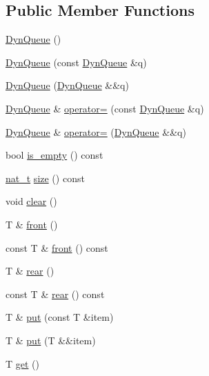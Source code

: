 \subsection*{Public Member Functions}
\begin{DoxyCompactItemize}
\item 
\hyperlink{class_designar_1_1_dyn_queue_a947ebdf2503509cdacd5e34a6de29197}{Dyn\+Queue} ()
\item 
\hyperlink{class_designar_1_1_dyn_queue_a612ed3480c13f60be2f9706601f846b1}{Dyn\+Queue} (const \hyperlink{class_designar_1_1_dyn_queue}{Dyn\+Queue} \&q)
\item 
\hyperlink{class_designar_1_1_dyn_queue_ad5d501cf675b1d5b2c0e0b6799cf77ec}{Dyn\+Queue} (\hyperlink{class_designar_1_1_dyn_queue}{Dyn\+Queue} \&\&q)
\item 
\hyperlink{class_designar_1_1_dyn_queue}{Dyn\+Queue} \& \hyperlink{class_designar_1_1_dyn_queue_a8936e37e8c235dea1201934067440eb7}{operator=} (const \hyperlink{class_designar_1_1_dyn_queue}{Dyn\+Queue} \&q)
\item 
\hyperlink{class_designar_1_1_dyn_queue}{Dyn\+Queue} \& \hyperlink{class_designar_1_1_dyn_queue_ad5d4745d5e0c3640a413897f8d72ed25}{operator=} (\hyperlink{class_designar_1_1_dyn_queue}{Dyn\+Queue} \&\&q)
\item 
bool \hyperlink{class_designar_1_1_dyn_queue_ae0c3b0a4a0c5028a12d8a564182d2b3e}{is\+\_\+empty} () const
\item 
\hyperlink{namespace_designar_aa72662848b9f4815e7bf31a7cf3e33d1}{nat\+\_\+t} \hyperlink{class_designar_1_1_dyn_queue_a3fa0e8fd7d197de1a60caae23b5c305e}{size} () const
\item 
void \hyperlink{class_designar_1_1_dyn_queue_adc396896fa4b333de8ae60ed8b8da2ea}{clear} ()
\item 
T \& \hyperlink{class_designar_1_1_dyn_queue_a910f0dc9d3bf1c1b2363730db842980d}{front} ()
\item 
const T \& \hyperlink{class_designar_1_1_dyn_queue_ae8e017797ad0ccd8a0568f69f8adedbf}{front} () const
\item 
T \& \hyperlink{class_designar_1_1_dyn_queue_a735f5a7d869689994d81d593b1924c68}{rear} ()
\item 
const T \& \hyperlink{class_designar_1_1_dyn_queue_a378a92d95bb351f2cc1b8fb80f6c9525}{rear} () const
\item 
T \& \hyperlink{class_designar_1_1_dyn_queue_a4564ed0e64b06d4a96ff020ba3456706}{put} (const T \&item)
\item 
T \& \hyperlink{class_designar_1_1_dyn_queue_a53c4e234aacf16fdb7e99625edadad61}{put} (T \&\&item)
\item 
T \hyperlink{class_designar_1_1_dyn_queue_a70b3f577ec11287fe63766de53a2cb56}{get} ()
\end{DoxyCompactItemize}


